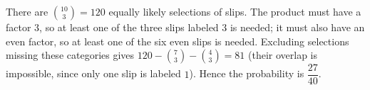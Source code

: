 There are $\binom{10}{3}=120$ equally likely selections of slips. The product must have a factor $3$, so at least one of the three slips labeled $3$ is needed; it must also have an even factor, so at least one of the six even slips is needed. Excluding selections missing these categories gives $120-\binom73-\binom43=81$ (their overlap is impossible, since only one slip is labeled $1$). Hence the probability is $\boxed{\dfrac{27}{40}}$.
